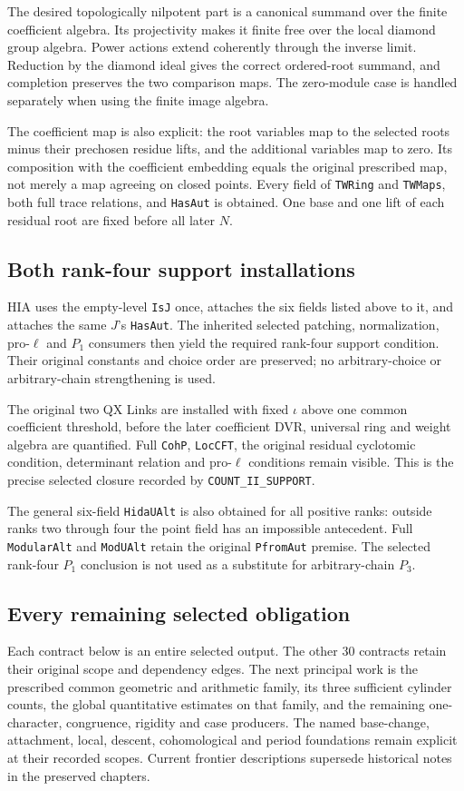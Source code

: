 The desired topologically nilpotent part is a canonical summand
over the finite coefficient algebra.  Its projectivity makes it
finite free over the local diamond group algebra.  Power actions
extend coherently through the inverse limit.  Reduction by the
diamond ideal gives the correct ordered-root summand, and
completion preserves the two comparison maps.  The zero-module
case is handled separately when using the finite image algebra.

The coefficient map is also explicit: the root variables map
to the selected roots minus their prechosen residue lifts, and
the additional variables map to zero.  Its composition with the
coefficient embedding equals the original prescribed map, not
merely a map agreeing on closed points.  Every field of
\texttt{TWRing} and \texttt{TWMaps}, both full trace relations,
and \texttt{HasAut} is obtained.  One base and one lift of each
residual root are fixed before all later $N$.

\subsection{Both rank-four support installations}

HIA uses the empty-level \texttt{IsJ} once, attaches the six
fields listed above to it, and attaches the same $J$'s
\texttt{HasAut}.  The inherited selected patching, normalization,
pro-$\ell$ and $P_1$ consumers then yield the required rank-four
support condition.  Their original constants and choice order
are preserved; no arbitrary-choice or arbitrary-chain
strengthening is used.

The original two QX Links are installed with fixed $\iota$ above
one common coefficient threshold, before the later coefficient
DVR, universal ring and weight algebra are quantified.  Full
\texttt{CohP}, \texttt{LocCFT}, the original residual
cyclotomic condition, determinant relation and pro-$\ell$
conditions remain visible.  This is the precise selected closure
recorded by \texttt{COUNT\_II\_SUPPORT}.

The general six-field \texttt{HidaUAlt} is also obtained for
all positive ranks: outside ranks two through four the point
field has an impossible antecedent.  Full \texttt{ModularAlt}
and \texttt{ModUAlt} retain the original \texttt{PfromAut}
premise.  The selected rank-four $P_1$ conclusion is not used
as a substitute for arbitrary-chain $P_3$.

\subsection{Every remaining selected obligation}

Each contract below is an entire selected output.  The other 30
contracts retain their original scope and dependency edges.
The next principal work is the prescribed common geometric and
arithmetic family, its three sufficient cylinder counts, the
global quantitative estimates on that family, and the remaining
one-character, congruence, rigidity and case producers.  The named
base-change, attachment, local, descent, cohomological and period
foundations remain explicit at their recorded scopes.  Current
frontier descriptions supersede historical notes in the preserved
chapters.
